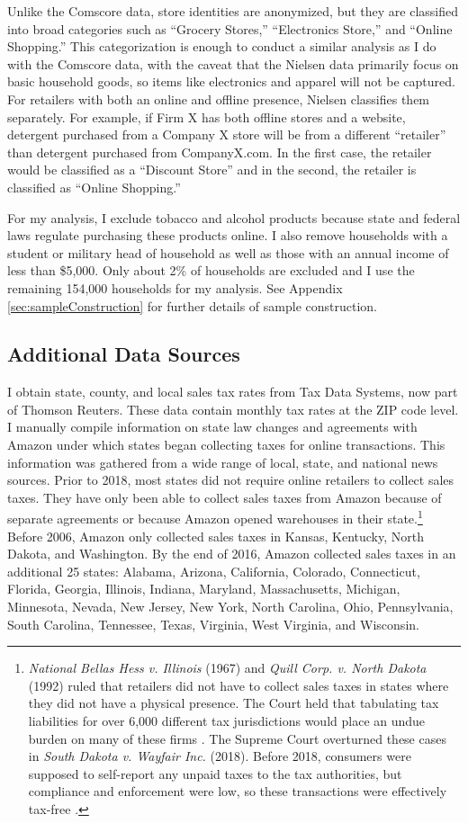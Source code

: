 \documentclass[AEJ,reviewmode]{AEA}
\begin{document}
Unlike the Comscore data, store identities are anonymized, but they are classified into broad categories such as ``Grocery Stores,'' ``Electronics Store,'' and ``Online Shopping.'' This categorization is enough to conduct a similar analysis as I do with the Comscore data, with the caveat that the Nielsen data primarily focus on basic household goods, so items like electronics and apparel will not be captured. For retailers with both an online and offline presence, Nielsen classifies them separately. For example, if Firm X has both offline stores and a website, detergent purchased from a Company X store will be from a different ``retailer'' than detergent purchased from CompanyX.com. In the first case, the retailer would be classified as a ``Discount Store'' and in the second, the retailer is classified as ``Online Shopping.''

For my analysis, I exclude tobacco and alcohol products because state and federal laws regulate purchasing these products online. I also remove households with a student or military head of household as well as those with an annual income of less than \$5,000. Only about 2\% of households are excluded and I use the remaining 154,000 households for my analysis. See Appendix \ref{sec:sampleConstruction} for further details of sample construction.

\subsection{Additional Data Sources}
I obtain state, county, and local sales tax rates from Tax Data Systems, now part of Thomson Reuters. These data contain monthly tax rates at the ZIP code level. I manually compile information on state law changes and agreements with Amazon under which states began collecting taxes for online transactions. This information was gathered from a wide range of local, state, and national news sources. Prior to 2018, most states did not require online retailers to collect sales taxes. They have only been able to collect sales taxes from Amazon because of separate agreements or because Amazon opened warehouses in their state.\footnote{\textit{National Bellas Hess v. Illinois} (1967) and \textit{Quill Corp. v. North Dakota} (1992) ruled that retailers did not have to collect sales taxes in states where they did not have a physical presence. The Court held that tabulating tax liabilities for over 6,000 different tax jurisdictions would place an undue burden on many of these firms \citep{taxFound2005}. The Supreme Court overturned these cases in \textit{South Dakota v. Wayfair Inc.} (2018). Before 2018, consumers were supposed to self-report any unpaid taxes to the tax authorities, but compliance and enforcement were low, so these transactions were effectively tax-free \citep{manzi2015}.} Before 2006, Amazon only collected sales taxes in Kansas, Kentucky, North Dakota, and Washington. By the end of 2016, Amazon collected sales taxes in an additional 25 states: Alabama, Arizona, California, Colorado, Connecticut, Florida, Georgia, Illinois, Indiana, Maryland, Massachusetts, Michigan, Minnesota, Nevada, New Jersey, New York, North Carolina, Ohio, Pennsylvania, South Carolina, Tennessee, Texas, Virginia, West Virginia, and Wisconsin.
\end{document}
